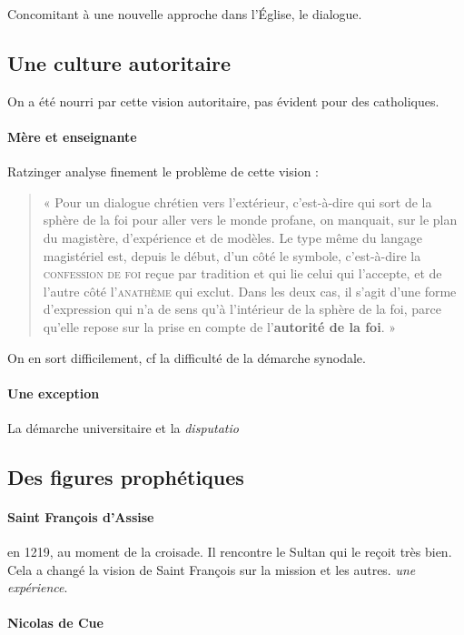  Concomitant à une nouvelle approche dans l'Église, le dialogue.


  \subsection{Une culture autoritaire}
  
  On a été nourri par cette vision autoritaire, pas évident pour des catholiques.
  \paragraph{Mère et enseignante} Ratzinger analyse finement le problème de cette vision : 
  \begin{quote}
      « Pour un dialogue chrétien vers l’extérieur, c’est-à-dire qui sort de la sphère de la foi pour aller vers le monde profane, on manquait, sur le plan du magistère, d’expérience et de modèles. Le type même du langage magistériel est, depuis le début, d’un côté le symbole, c’est-à-dire la \textsc{confession de foi} reçue par tradition et qui lie celui qui l’accepte, et de l’autre côté l’\textsc{anathème} qui exclut. Dans les deux cas, il s’agit d’une forme d’expression qui n’a de sens qu’à l’intérieur de la sphère de la foi, parce qu’elle repose sur la prise en compte de l’\textbf{autorité de la foi}. » 
  \end{quote}
  
  On en sort difficilement, cf la difficulté de la démarche synodale.
  \paragraph{Une exception} La démarche universitaire et la \textit{disputatio}
  
  \subsection{Des figures prophétiques }
  
  \paragraph{Saint François d'Assise} en 1219, au moment de la croisade. Il rencontre le Sultan qui le reçoit très bien. Cela a changé la vision de Saint François sur la mission et les autres. \textit{une expérience}. 
  
  \paragraph{Nicolas de Cue}
  
